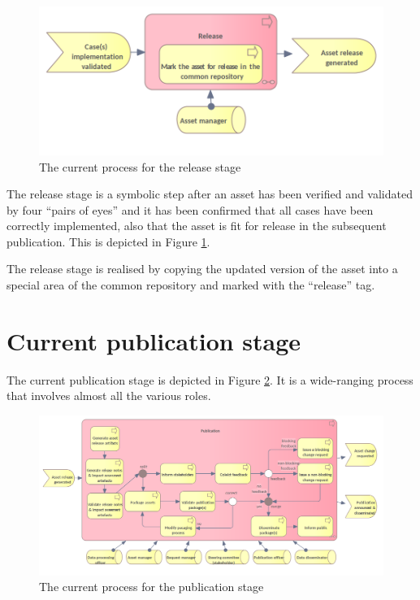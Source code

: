 	\begin{figure}[h]
		\centering
		\includegraphics[width=.6\textwidth]{images/business/current/Release.png}
		\caption{The current process for the release stage}
		\label{fig:release-current}
	\end{figure}

	The release stage is a symbolic step after an asset has been verified and validated by four ``pairs of eyes'' and it has been confirmed that all cases have been correctly implemented, also that the asset is fit for release in the subsequent publication. This is depicted in Figure \ref{fig:release-current}.

	The release stage is realised by copying the updated version of the asset into a special area of the common repository and marked with the ``release'' tag.

	\section{Current publication stage}
	
	The current publication stage is depicted in Figure \ref{fig:publication-current}. It is a wide-ranging process that involves almost all the various roles. 
	
	\label{sec:publication-current}
		\begin{figure}[h]
		\centering
		\includegraphics[width=1.03\textwidth]{images/business/current/Publication.png}
		\caption{The current process for the publication stage}
		\label{fig:publication-current}
	\end{figure}

